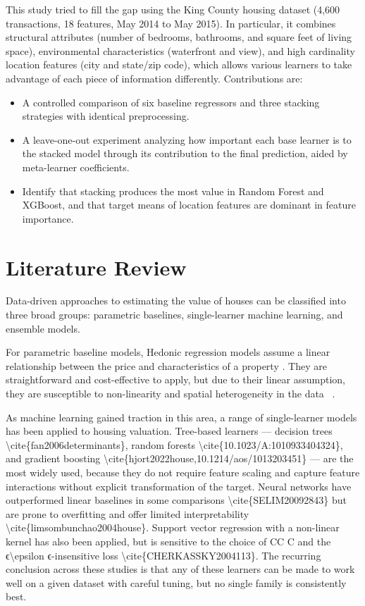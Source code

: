 \documentclass[conference]{IEEEtran}
\begin{document}
This study tried to fill the gap using the King County housing dataset (4,600 transactions, 18 features, May 2014 to May 2015). In particular, it combines  structural attributes (number of bedrooms, bathrooms, and square feet of living space), environmental characteristics (waterfront and view), and high cardinality location features (city and state/zip code), which allows various learners to take advantage of each piece of information differently. Contributions are:
\begin{itemize}
    \item A controlled comparison of six baseline regressors and three stacking strategies with identical preprocessing.
    \item A leave-one-out experiment analyzing how important each base learner is to the stacked model through its contribution to the final prediction, aided by meta-learner coefficients.
    \item  Identify that stacking produces the most value in Random Forest and XGBoost, and that target means of location features are dominant in feature importance. 
\end{itemize}

\section{Literature Review}
Data-driven approaches to estimating the value of houses can be classified into three broad groups: parametric baselines, single-learner machine learning, and ensemble models. 

For parametric baseline models, Hedonic regression models assume a linear relationship between the price and characteristics of a property  \cite{KOK2014136}. They are straightforward and cost-effective to apply, but due to their linear assumption, they are susceptible to non-linearity and spatial heterogeneity in the data \ \cite{SELIM20092843,limsombunchao2004house}.

As machine learning gained traction in this area, a range of single-learner models has been applied to housing valuation. Tree-based learners — decision trees \textbackslash{}cite\{fan2006determinants\}, random forests \textbackslash{}cite\{10.1023/A:1010933404324\}, and gradient boosting \textbackslash{}cite\{hjort2022house,10.1214/aos/1013203451\} — are the most widely used, because they do not require feature scaling and capture feature interactions without explicit transformation of the target. Neural networks have outperformed linear baselines in some comparisons \textbackslash{}cite\{SELIM20092843\} but are prone to overfitting and offer limited interpretability \textbackslash{}cite\{limsombunchao2004house\}. Support vector regression with a non-linear kernel has also been applied, but is sensitive to the choice of CC C and the ϵ\textbackslash{}epsilon ϵ-insensitive loss \textbackslash{}cite\{CHERKASSKY2004113\}. The recurring conclusion across these studies is that any of these learners can be made to work well on a given dataset with careful tuning, but no single family is consistently best.
\end{document}
